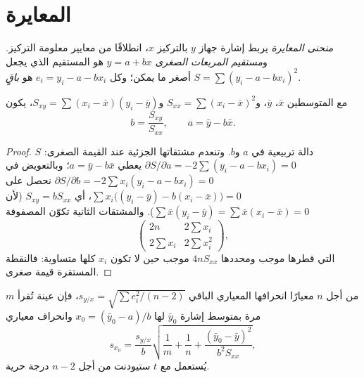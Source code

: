 \section{المعايرة}

\begin{definition}\label{def:b2:measurement-statistics:calibration}
\emph{منحنى المعايرة} يربط إشارة جهاز $y$ بالتركيز
$x$، انطلاقًا من معايير معلومة التركيز. و\emph{مستقيم المربعات
الصغرى} $y = a + bx$ هو المستقيم الذي يجعل $S = \sum (y_i - a -
bx_i)^2$ أصغر ما يمكن؛ وكل $e_i = y_i - a - bx_i$ هو \emph{باقٍ}.
\end{definition}

\begin{theorem}\label{thm:b2:measurement-statistics:least-squares}
مع المتوسطين $\bar x$، $\bar y$، و$S_{xx} = \sum(x_i - \bar x)^2$ و$S_{xy} = \sum(x_i - \bar x)(y_i -
\bar y)$، يكون 
\begin{equation*}
b = \frac{S_{xy}}{S_{xx}}, \qquad a = \bar y - b\bar x.
\end{equation*}
\end{theorem}

\begin{proof}
$S$ دالة تربيعية في $a$ و$b$. وتنعدم مشتقاتها الجزئية عند القيمة الصغرى:
$\partial S/\partial a = -2\sum(y_i - a - bx_i) = 0$ يعطي $a = \bar y - b\bar x$؛ وبالتعويض في
$\partial S/\partial b = -2\sum x_i(y_i - a - bx_i) = 0$ نحصل على $\sum x_i\bigl((y_i - \bar y) - b(x_i -
\bar x)\bigr) = 0$، أي $S_{xy} = bS_{xx}$ (لأن $\sum \bar x(y_i - \bar y) = \sum \bar x(x_i - \bar
x) = 0$). والمشتقات الثانية تكوّن المصفوفة
\[\begin{pmatrix} 2n & 2\sum x_i\\ 2\sum x_i & 2\sum x_i^2\end{pmatrix},\]
التي قطرها موجب ومحددها $4nS_{xx}$ موجب حين لا تكون $x_i$ كلها
متساوية: فالنقطة المستقرة قيمة صغرى.
\end{proof}

\begin{proposition}\label{prop:b2:measurement-statistics:interpolation}
من أجل $n$ معيارًا انحرافها المعياري الباقي $s_{y/x} = \sqrt{\sum e_i^2/(n-2)}$، فإن عينة تُقرأ
$m$ مرة بمتوسط إشارة $\bar y_0$ لها $x_0 = (\bar y_0 - a)/b$ وانحراف معياري
\begin{equation*}
s_{x_0} = \frac{s_{y/x}}{b}\sqrt{\frac1m + \frac1n + \frac{(\bar y_0 - \bar y)^2}{b^2S_{xx}}},
\end{equation*}
يُستعمل مع $t$ ستيودنت من أجل $n - 2$ درجة حرية.
\end{proposition}

